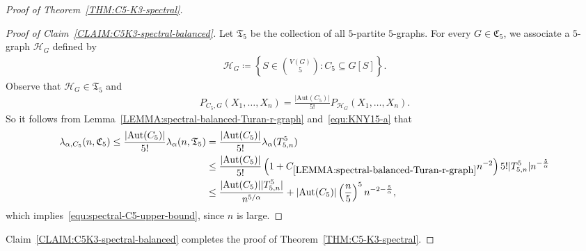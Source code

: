 \documentclass[11pt,a4paper]{article}
\begin{document}
\begin{proof}[Proof of Theorem~\ref{THM:C5-K3-spectral}]
\begin{proof}[Proof of Claim~\ref{CLAIM:C5K3-spectral-balanced}]
        Let $\mathfrak{T}_{5}$ be the collection of all $5$-partite $5$-graphs. 
        For every $G \in \mathfrak{C}_{5}$, we associate a $5$-graph $\mathcal{H}_{G}$ defined by
        \begin{align*}
            \mathcal{H}_{G}
            \coloneqq \left\{ S\in \binom{V(G)}{5} \colon C_5 \subseteq G[S] \right\}. 
        \end{align*}
        Observe that $\mathcal{H}_{G} \in \mathfrak{T}_{5}$ and 
        \begin{align*}
            P_{C_5, G}(X_1, \ldots, X_n)
            = \frac{|\mathrm{Aut}(C_5)|}{5!} P_{\mathcal{H}_{G}}(X_1, \ldots, X_n). 
        \end{align*}
        So it follows from Lemma~\ref{LEMMA:spectral-balanced-Turan-r-graph} and~\eqref{equ:KNY15-a} that 
        \begin{align*}
            \lambda_{\alpha, C_5}(n, \mathfrak{C}_5)
            \le \frac{|\mathrm{Aut}(C_5)|}{5!} \lambda_{\alpha}(n, \mathfrak{T}_5)
            & = \frac{|\mathrm{Aut}(C_5)|}{5!} \lambda_{\alpha}(T_{5,n}^{5}) \\
            & \le \frac{|\mathrm{Aut}(C_5)|}{5!} \left(1+C_{\ref{LEMMA:spectral-balanced-Turan-r-graph}} n^{-2}\right) 5! |T_{5,n}^{5}| n^{-\frac{5}{\alpha}} \\
            & \le \frac{|\mathrm{Aut}(C_5)| |T_{5,n}^{5}|}{n^{5/\alpha}} + |\mathrm{Aut}(C_5)| \left(\frac{n}{5}\right)^{5} n^{-2-\frac{5}{\alpha}}, 
        \end{align*}
        which implies~\eqref{equ:spectral-C5-upper-bound}, since $n$ is large. 
    \end{proof}%

    Claim~\ref{CLAIM:C5K3-spectral-balanced} completes the proof of Theorem~\ref{THM:C5-K3-spectral}. 
\end{proof}%

\end{document}
